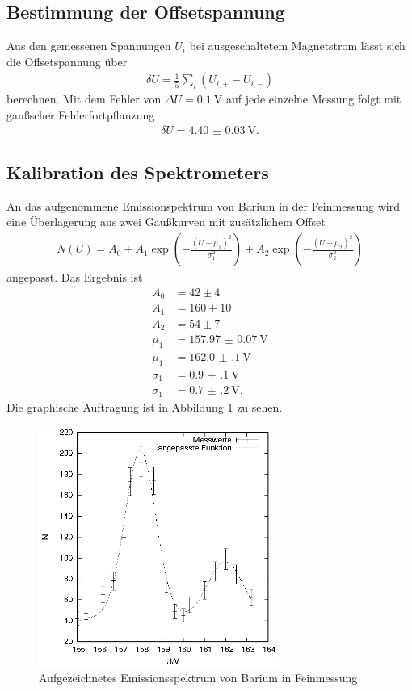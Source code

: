 \subsection{Bestimmung der Offsetspannung}
Aus den gemessenen Spannungen $U_i$ bei ausgeschaltetem Magnetstrom lässt sich die Offsetspannung über
\begin{align*}
  \delta U=\frac{1}{5}\sum_i (U_{i,+}-U_{i,-})
\end{align*}
berechnen. Mit dem Fehler von $\Delta U=\SI{0.1}{\volt}$ auf jede einzelne Messung folgt mit gaußscher Fehlerfortpflanzung
\begin{align*}
  \delta U= \SI[separate-uncertainty=true]{4.40(3)}{\volt}.
\end{align*}

\subsection{Kalibration des Spektrometers}
An das aufgenommene Emissionspektrum von Barium in der Feinmessung wird eine Überlagerung aus zwei Gaußkurven mit zusätzlichem Offset
\begin{align*}
  N(U)=A_0+A_1\exp \left(-\frac{(U-\mu_1)^2}{\sigma_1^2}\right) +A_2\exp\left(-\frac{(U-\mu_2)^2}{\sigma_2^2} \right)
\end{align*}
angepasst. Das Ergebnis ist
\begin{align*}
  A_0&=42\pm 4\\
  A_1&=160\pm 10\\
  A_2&=54\pm 7\\
  \mu_1&=\SI[separate-uncertainty=true]{157.97(7)}{\volt}\\
  \mu_1&=\SI[separate-uncertainty=true]{162.0(1)}{\volt}\\
  \sigma_1&=\SI[separate-uncertainty=true]{0.9(1)}{\volt}\\
  \sigma_1&=\SI[separate-uncertainty=true]{0.7(2)}{\volt}.
\end{align*}
Die graphische Auftragung ist in Abbildung \ref{fig:ba_fein} zu sehen.
\begin{figure}[h]
  \centering
  \includegraphics[width=0.7\textwidth]{data/Ba_fein.eps}
  \caption{Aufgezeichnetes Emissionsspektrum von Barium in Feinmessung}
  \label{fig:ba_fein}
\end{figure}
